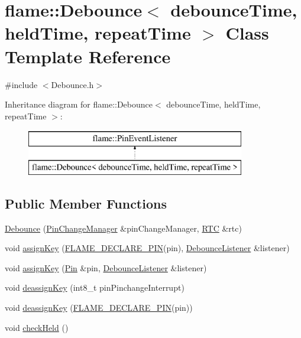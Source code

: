 \hypertarget{classflame_1_1_debounce}{\section{flame\-:\-:Debounce$<$ debounce\-Time, held\-Time, repeat\-Time $>$ Class Template Reference}
\label{classflame_1_1_debounce}
}


{\ttfamily \#include $<$Debounce.\-h$>$}

Inheritance diagram for flame\-:\-:Debounce$<$ debounce\-Time, held\-Time, repeat\-Time $>$\-:\begin{figure}[H]
\begin{center}
\leavevmode
\includegraphics[height=2.000000cm]{classflame_1_1_debounce}
\end{center}
\end{figure}
\subsection*{Public Member Functions}
\begin{DoxyCompactItemize}
\item 
\hyperlink{classflame_1_1_debounce_a4df4da4a7b49deac584e1bc2b011bad7}{Debounce} (\hyperlink{classflame_1_1_pin_change_manager}{Pin\-Change\-Manager} \&pin\-Change\-Manager, \hyperlink{classflame_1_1_r_t_c}{R\-T\-C} \&rtc)
\item 
void \hyperlink{classflame_1_1_debounce_abfdb85e459052118a72879698af85d87}{assign\-Key} (\hyperlink{io_8h_ab54f3ca5cc36256b922289e8e92316a3}{F\-L\-A\-M\-E\-\_\-\-D\-E\-C\-L\-A\-R\-E\-\_\-\-P\-I\-N}(pin), \hyperlink{classflame_1_1_debounce_listener}{Debounce\-Listener} \&listener)
\item 
void \hyperlink{classflame_1_1_debounce_a63bad9d7e92a998325c9fb942775aae4}{assign\-Key} (\hyperlink{classflame_1_1_pin}{Pin} \&pin, \hyperlink{classflame_1_1_debounce_listener}{Debounce\-Listener} \&listener)
\item 
void \hyperlink{classflame_1_1_debounce_a56cb69574f06584007723ecefbd3073c}{deassign\-Key} (int8\-\_\-t pin\-Pinchange\-Interrupt)
\item 
void \hyperlink{classflame_1_1_debounce_a3ae08a19b2f300ea31f2f6da9b292380}{deassign\-Key} (\hyperlink{io_8h_ab54f3ca5cc36256b922289e8e92316a3}{F\-L\-A\-M\-E\-\_\-\-D\-E\-C\-L\-A\-R\-E\-\_\-\-P\-I\-N}(pin))
\item 
void \hyperlink{classflame_1_1_debounce_aabe8d69b5a537c39adda9ea88c129249}{check\-Held} ()
\end{DoxyCompactItemize}
